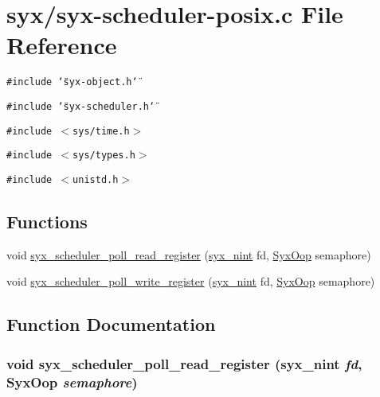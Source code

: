 \hypertarget{syx-scheduler-posix_8c}{
\section{syx/syx-scheduler-posix.c File Reference}
\label{syx-scheduler-posix_8c}
}
{\tt \#include \char`\"{}syx-object.h\char`\"{}}\par
{\tt \#include \char`\"{}syx-scheduler.h\char`\"{}}\par
{\tt \#include $<$sys/time.h$>$}\par
{\tt \#include $<$sys/types.h$>$}\par
{\tt \#include $<$unistd.h$>$}\par
\subsection*{Functions}
\begin{CompactItemize}
\item 
void \hyperlink{syx-scheduler-posix_8c_0f6beab52e1173b6a531ba23d437b2bf}{syx\_\-scheduler\_\-poll\_\-read\_\-register} (\hyperlink{syx-types_8h_488ad2504ade19c761a3e2a1726b4781}{syx\_\-nint} fd, \hyperlink{syx-types_8h_1121caba2d40b2ce090b640762744ccd}{SyxOop} semaphore)
\item 
void \hyperlink{syx-scheduler-posix_8c_28eac1f77d3be9549426a9166ac5a9f3}{syx\_\-scheduler\_\-poll\_\-write\_\-register} (\hyperlink{syx-types_8h_488ad2504ade19c761a3e2a1726b4781}{syx\_\-nint} fd, \hyperlink{syx-types_8h_1121caba2d40b2ce090b640762744ccd}{SyxOop} semaphore)
\end{CompactItemize}


\subsection{Function Documentation}
\hypertarget{syx-scheduler-posix_8c_0f6beab52e1173b6a531ba23d437b2bf}{
\subsubsection{\setlength{\rightskip}{0pt plus 5cm}void syx\_\-scheduler\_\-poll\_\-read\_\-register ({\bf syx\_\-nint} {\em fd}, \/  {\bf SyxOop} {\em semaphore})}}
\label{syx-scheduler-posix_8c_0f6beab52e1173b6a531ba23d437b2bf}


